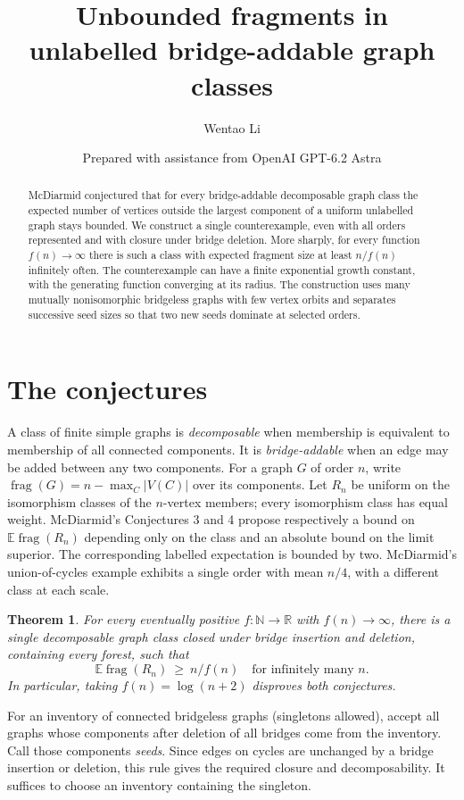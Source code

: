 \documentclass[11pt]{article}
\title{Unbounded fragments in unlabelled bridge-addable graph classes}
\author{Wentao Li}
\date{\small Prepared with assistance from OpenAI GPT-6.2 Astra}
\newtheorem{theorem}{Theorem}
\newcommand{\frag}{\operatorname{frag}}
\begin{document}
\maketitle
\begin{abstract}
McDiarmid conjectured that for every bridge-addable decomposable graph class the expected number of vertices outside the largest component of a uniform unlabelled graph stays bounded. We construct a single counterexample, even with all orders represented and with closure under bridge deletion. More sharply, for every function $f(n)\to\infty$ there is such a class with expected fragment size at least $n/f(n)$ infinitely often. The counterexample can have a finite exponential growth constant, with the generating function converging at its radius. The construction uses many mutually nonisomorphic bridgeless graphs with few vertex orbits and separates successive seed sizes so that two new seeds dominate at selected orders.
\end{abstract}

\section{The conjectures}
A class of finite simple graphs is \emph{decomposable} when membership is equivalent to membership of all connected components. It is \emph{bridge-addable} when an edge may be added between any two components. For a graph $G$ of order $n$, write $\frag(G)=n-\max_C |V(C)|$ over its components. Let $R_n$ be uniform on the isomorphism classes of the $n$-vertex members; every isomorphism class has equal weight. McDiarmid's Conjectures 3 and 4 \cite{mcd} propose respectively a bound on $\mathbb E\frag(R_n)$ depending only on the class and an absolute bound on the limit superior. The corresponding labelled expectation is bounded by two. McDiarmid's union-of-cycles example exhibits a single order with mean $n/4$, with a different class at each scale.

\begin{theorem}\label{main}
For every eventually positive $f\colon\mathbb N\to\mathbb R$ with $f(n)\to\infty$, there is a single decomposable graph class closed under bridge insertion and deletion, containing every forest, such that
\[
       \mathbb E\frag(R_n)\ \ge\ n/f(n)
       \quad\text{for infinitely many }n .
\]
In particular, taking $f(n)=\log(n+2)$ disproves both conjectures.
\end{theorem}

For an inventory of connected bridgeless graphs (singletons allowed), accept all graphs whose components after deletion of all bridges come from the inventory. Call those components \emph{seeds}. Since edges on cycles are unchanged by a bridge insertion or deletion, this rule gives the required closure and decomposability. It suffices to choose an inventory containing the singleton.
\end{document}
